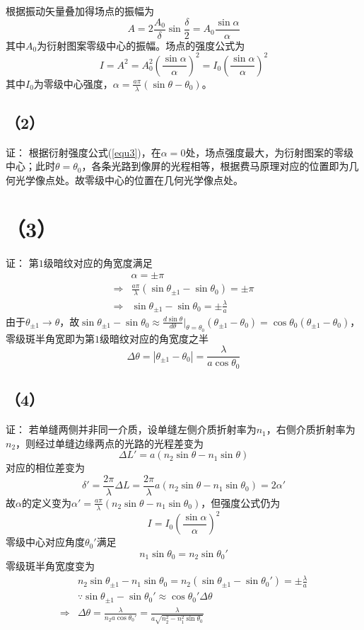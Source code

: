 \documentclass[10pt,a4paper]{article}
\begin{document}
\noindent 根据振动矢量叠加得场点的振幅为
\[
A=2\frac{A_0}{\delta}\sin\frac{\delta}{2}=A_0\frac{\sin\alpha}{\alpha}
\]
其中$A_0$为衍射图案零级中心的振幅。场点的强度公式为
\begin{equation}
\label{equ3}
I=A^2=A_0^2(\frac{\sin\alpha}{\alpha})^2=I_0(\frac{\sin\alpha}{\alpha})^2
\end{equation}
其中$I_0$为零级中心强度，$\alpha=\frac{a\pi}{\lambda}(\sin\theta-\theta_0)$。
\subsection*{（2）}证：
根据衍射强度公式(\ref{equ3})，在$\alpha=0$处，场点强度最大，为衍射图案的零级中心；此时$\theta=\theta_0$，各条光路到像屏的光程相等，根据费马原理对应的位置即为几何光学像点处。故零级中心的位置在几何光学像点处。
\section*{（3）}证：
第$1$级暗纹对应的角宽度满足
\begin{align*}
&\alpha=\pm\pi\\
\Longrightarrow&\frac{a\pi}{\lambda}(\sin\theta_{\pm1}-\sin\theta_0)=\pm\pi\\
\Longrightarrow&\sin\theta_{\pm1}-\sin\theta_0=\pm\frac{\lambda}{a}
\end{align*}
由于$\theta_{\pm1}\to\theta$，故$\sin\theta_{\pm1}-\sin\theta_0\approx\frac{d\sin\theta}{d\theta}|_{\theta=\theta_0}(\theta_{\pm1}-\theta_0)=\cos\theta_0(\theta_{\pm1}-\theta_0)$，零级斑半角宽即为第$1$级暗纹对应的角宽度之半
\[
\Delta\theta=|\theta_{\pm1}-\theta_0|=\frac{\lambda}{a\cos\theta_0}
\]
\subsection*{（4）}证：
若单缝两侧并非同一介质，设单缝左侧介质折射率为$n_1$，右侧介质折射率为$n_2$，则经过单缝边缘两点的光路的光程差变为
\[
\Delta L'=a(n_2\sin\theta-n_1\sin\theta)
\]
对应的相位差变为
\[
\delta'=\frac{2\pi}{\lambda}\Delta L=\frac{2\pi}{\lambda}a(n_2\sin\theta-n_1\sin\theta_0)=2\alpha'
\]
故$\alpha$的定义变为$\alpha'=\frac{a\pi}{\lambda}(n_2\sin\theta-n_1\sin\theta_0)$，但强度公式仍为
\[
I=I_0(\frac{\sin\alpha}{\alpha})^2
\]
零级中心对应角度$\theta_0'$满足
\[
n_1\sin\theta_0=n_2\sin\theta_0'
\]
零级斑半角宽度变为
\begin{align*}
&n_2\sin\theta_{\pm1}-n_1\sin\theta_0=n_2(\sin\theta_{\pm1}-\sin\theta_0')=\pm\frac{\lambda}{a}\\
&\because\sin\theta_{\pm1}-\sin\theta_0'\approx\cos\theta_0'\Delta\theta\\
\Longrightarrow&\Delta\theta=\frac{\lambda}{n_2a\cos\theta_0'}=\frac{\lambda}{a\sqrt{n_2^2-n_1^2\sin\theta_0}}
\end{align*}
\end{document}
